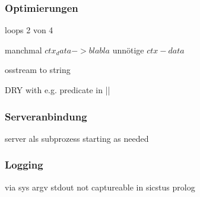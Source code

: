\subsubsection{Optimierungen}
\label{subsec:optimizations}

loops 2 von 4

manchmal $ctx_data -> blabla$ unnötige $ctx-data$

osstream to string

DRY with e.g. predicate in ||




\subsubsection{Serveranbindung}

server als subprozess
starting as needed

\subsubsection{Logging}

via sys argv
stdout not captureable in sicstus prolog



